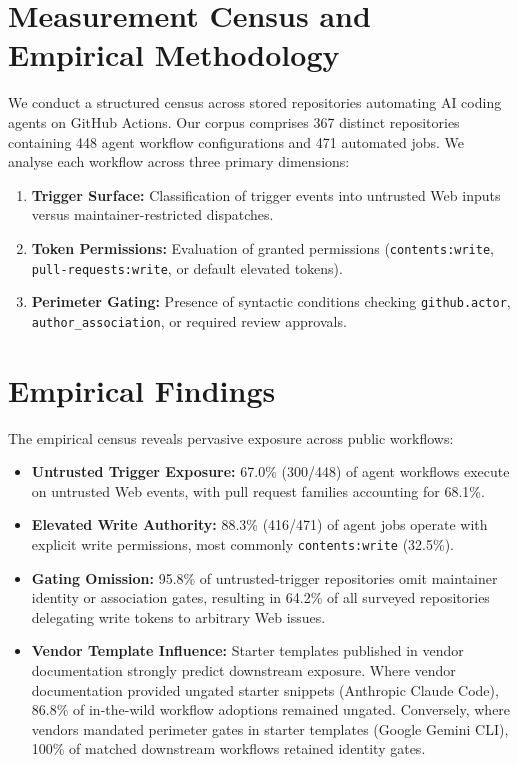 \documentclass[sigconf,anonymous,review]{acmart}
\begin{document}
\section{Measurement Census and Empirical Methodology}
\label{sec:census}
We conduct a structured census across stored repositories automating AI coding agents on GitHub Actions. Our corpus comprises 367 distinct repositories containing 448 agent workflow configurations and 471 automated jobs. We analyse each workflow across three primary dimensions:
\begin{enumerate}
    \item \textbf{Trigger Surface:} Classification of trigger events into untrusted Web inputs versus maintainer-restricted dispatches.
    \item \textbf{Token Permissions:} Evaluation of granted permissions (\texttt{contents:write}, \texttt{pull-requests:write}, or default elevated tokens).
    \item \textbf{Perimeter Gating:} Presence of syntactic conditions checking \texttt{github.actor}, \texttt{author\_association}, or required review approvals.
\end{enumerate}

\section{Empirical Findings}
\label{sec:findings}
The empirical census reveals pervasive exposure across public workflows:
\begin{itemize}
    \item \textbf{Untrusted Trigger Exposure:} 67.0\% (300/448) of agent workflows execute on untrusted Web events, with pull request families accounting for 68.1\%.
    \item \textbf{Elevated Write Authority:} 88.3\% (416/471) of agent jobs operate with explicit write permissions, most commonly \texttt{contents:write} (32.5\%).
    \item \textbf{Gating Omission:} 95.8\% of untrusted-trigger repositories omit maintainer identity or association gates, resulting in 64.2\% of all surveyed repositories delegating write tokens to arbitrary Web issues.
    \item \textbf{Vendor Template Influence:} Starter templates published in vendor documentation strongly predict downstream exposure. Where vendor documentation provided ungated starter snippets (Anthropic Claude Code), 86.8\% of in-the-wild workflow adoptions remained ungated. Conversely, where vendors mandated perimeter gates in starter templates (Google Gemini CLI), 100\% of matched downstream workflows retained identity gates.
\end{itemize}
\end{document}
